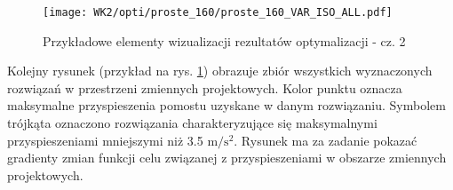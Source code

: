 \begin{figure}[hbt!]
	\centering
	\texttt{[image: WK2/opti/proste\_160/proste\_160\_VAR\_ISO\_ALL.pdf]}
	\captionsetup{justification=centering}
	\caption{Przykładowe elementy wizualizacji rezultatów optymalizacji - cz. 2}
	\label{fig:EXAMPLE_picture_3}
\end{figure}

Kolejny rysunek (przykład na rys. \ref{fig:EXAMPLE_picture_3}) obrazuje zbiór wszystkich wyznaczonych rozwiązań w przestrzeni zmiennych projektowych. Kolor punktu oznacza maksymalne przyspieszenia pomostu uzyskane w danym rozwiązaniu. Symbolem trójkąta oznaczono rozwiązania charakteryzujące się maksymalnymi przyspieszeniami mniejszymi niż 3.5 $\mathrm{m/s^2}$. Rysunek ma za zadanie pokazać gradienty zmian funkcji celu związanej z przyspieszeniami w obszarze zmiennych projektowych.



